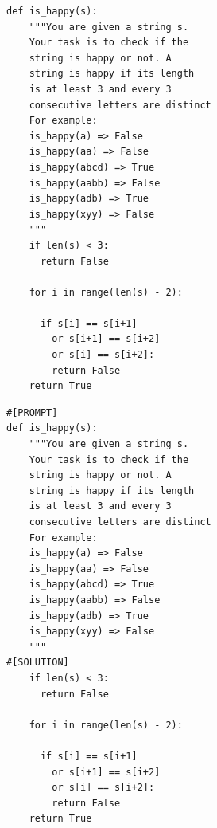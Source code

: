 \begin{tcolorbox}[title={The Stack Rephrased Sample}]

\begin{tcolorbox}[title={HumanEval test}, enhanced, colback=white, boxrule=1pt, sharp corners, boxsep=5pt, left=5pt, right=5pt, top=5pt, bottom=5pt]
\fontsize{8pt}{9.6pt}\selectfont
\begin{verbatim}
def is_happy(s):
    """You are given a string s.
    Your task is to check if the 
    string is happy or not. A 
    string is happy if its length 
    is at least 3 and every 3 
    consecutive letters are distinct
    For example:
    is_happy(a) => False
    is_happy(aa) => False
    is_happy(abcd) => True
    is_happy(aabb) => False
    is_happy(adb) => True
    is_happy(xyy) => False
    """
    if len(s) < 3:
      return False

    for i in range(len(s) - 2):
      
      if s[i] == s[i+1] 
        or s[i+1] == s[i+2] 
        or s[i] == s[i+2]:
        return False
    return True
\end{verbatim}
\end{tcolorbox}


\begin{tcolorbox}[title={The Stack}, enhanced, colback=white, boxrule=1pt, sharp corners, boxsep=5pt, left=5pt, right=5pt, top=5pt, bottom=5pt]
\fontsize{8pt}{9.6pt}\selectfont
\begin{verbatim}
#[PROMPT]
def is_happy(s):
    """You are given a string s.
    Your task is to check if the 
    string is happy or not. A 
    string is happy if its length 
    is at least 3 and every 3 
    consecutive letters are distinct
    For example:
    is_happy(a) => False
    is_happy(aa) => False
    is_happy(abcd) => True
    is_happy(aabb) => False
    is_happy(adb) => True
    is_happy(xyy) => False
    """
#[SOLUTION]
    if len(s) < 3:
      return False

    for i in range(len(s) - 2):
      
      if s[i] == s[i+1] 
        or s[i+1] == s[i+2] 
        or s[i] == s[i+2]:
        return False
    return True
\end{verbatim}
\end{tcolorbox}

\end{tcolorbox}





